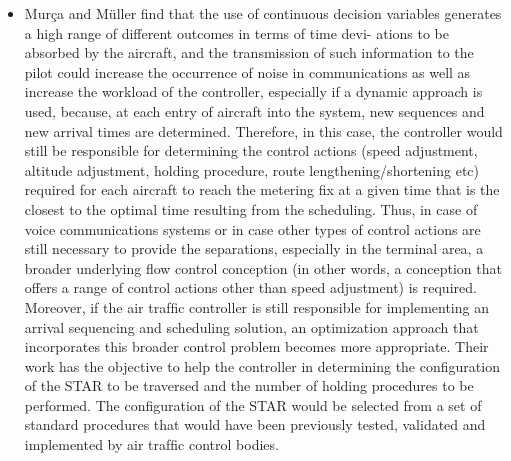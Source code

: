 \documentclass{aer1315-pretty}
\begin{document}
\begin{itemize}
\item Mur\c{c}a and M{\"u}ller \cite{Murca:2015} find that the use of continuous decision variables generates a high range of different outcomes in terms of time devi-
ations to be absorbed by the aircraft, and the transmission of such information to the pilot could increase the occurrence of noise in communications as well as increase the workload of the controller, especially if a dynamic approach is used, because, at each entry of aircraft into the system, new sequences and new arrival times are determined. Therefore, in this case, the controller would still be responsible for determining the control actions (speed adjustment, altitude adjustment, holding procedure, route lengthening/shortening etc) required for each aircraft to reach the metering ﬁx at a given time that is the closest to the optimal time resulting from the scheduling. Thus, in case of voice communications systems or in case other types of control actions are still necessary to provide the separations, especially in the terminal area, a broader underlying ﬂow control conception (in other words, a conception that offers a range of control actions other than speed adjustment) is required. Moreover, if the air trafﬁc controller is still responsible for implementing an arrival sequencing and scheduling solution, an optimization approach that incorporates this broader control problem becomes more appropriate. Their work has the objective to help the controller in determining the conﬁguration of the STAR to be traversed and the number of holding procedures to be performed. The conﬁguration of the STAR would be selected from a set of standard procedures that would have been previously tested, validated and implemented by air trafﬁc control bodies. 



\end{itemize}
\end{document}

